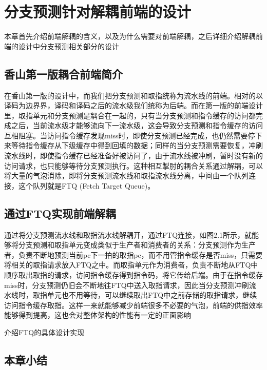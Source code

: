 \chapter{分支预测针对解耦前端的设计}

本章首先介绍前端解耦的含义，以及为什么需要对前端解耦，之后详细介绍解耦前端的设计中分支预测相关部分的设计

\section{香山第一版耦合前端简介}

在香山第一版的设计中，而我们把分支预测和取指统称为流水线的前端。相对的以译码为边界界，译码和译码之后的流水级我们统称为后端。而在第一版的前端设计里，取指单元和分支预测是耦合在一起的，只有当分支预测和指令缓存的访问都完成之后，当前流水级才能够流向下一流水级，这会导致分支预测和指令缓存的访问互相阻塞。当访问指令缓存发现miss时，即使分支预测已经完成，也仍然需要停下来等待指令缓存从下级缓存中得到回填的数据；同样的当分支预测需要恢复，冲刷流水线时，即使指令缓存已经准备好被访问了，由于流水线被冲刷，暂时没有新的访问请求，也只能够等待分支预测执行。这种相互掣肘的耦合关系通过解耦，可以将大量的气泡消除，即将分支预测流水线和取指流水线分离，中间由一个队列连接，这个队列就是FTQ (Fetch Target Queue)。

\section{通过FTQ实现前端解耦}

通过将分支预测流水线和取指流水线解耦开，通过FTQ连接，如图2.1所示，就能够将分支预测和取指单元变成类似于生产者和消费者的关系：分支预测作为生产者，负责不断地预测当前pc下一拍的取指pc，而不用管指令缓存是否miss，只需要将相关的取指请求放入FTQ之中。而取指单元作为消费者，负责不断地从FTQ中顺序取出取指的请求，访问指令缓存得到指令码，将它传给后端。由于在指令缓存miss时，分支预测仍旧会不断地往FTQ中送入取指请求，因此当分支预测冲刷流水线时，取指单元也不用等待，可以继续取出FTQ中之前存储的取指请求，继续访问指令缓存取指。这样一来就能够减少前端很多不必要的气泡，前端的供指效率能够得到提高，这也会对整体架构的性能有一定的正面影响

介绍FTQ的具体设计实现

\section{本章小结}

